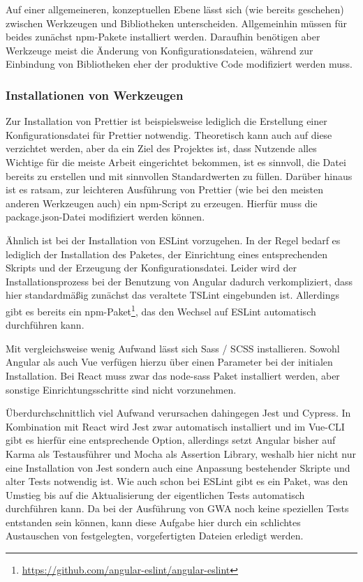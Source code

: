 Auf einer allgemeineren, konzeptuellen Ebene lässt sich (wie bereits geschehen) zwischen Werkzeugen und Bibliotheken unterscheiden. Allgemeinhin müssen für beides zunächst \gls{npm}-Pakete installiert werden. Daraufhin benötigen aber Werkzeuge meist die Änderung von Konfigurationsdateien, während zur Einbindung von Bibliotheken eher der produktive Code modifiziert werden muss.

\subsubsection{Installationen von Werkzeugen}
Zur Installation von Prettier ist beispielsweise lediglich die Erstellung einer Konfigurationsdatei für Prettier notwendig. Theoretisch kann auch auf diese verzichtet werden, aber da ein Ziel des Projektes ist, dass Nutzende alles Wichtige für die meiste Arbeit eingerichtet bekommen, ist es sinnvoll, die Datei bereits zu erstellen und mit sinnvollen Standardwerten zu füllen. Darüber hinaus ist es ratsam, zur leichteren Ausführung von Prettier (wie bei den meisten anderen Werkzeugen auch) ein \gls{npm}-Script zu erzeugen. Hierfür muss die package.json-Datei modifiziert werden können.

Ähnlich ist bei der Installation von ESLint vorzugehen. In der Regel bedarf es lediglich der Installation des Paketes, der Einrichtung eines entsprechenden Skripts und der Erzeugung der Konfigurationsdatei. Leider wird der Installationsprozess bei der Benutzung von Angular dadurch verkompliziert, dass hier standardmäßig zunächst das veraltete TSLint eingebunden ist. Allerdings gibt es bereits ein \gls{npm}-Paket\footnote{\url{https://github.com/angular-eslint/angular-eslint}}, das den Wechsel auf ESLint automatisch durchführen kann.

Mit vergleichsweise wenig Aufwand lässt sich Sass / SCSS installieren. Sowohl Angular als auch Vue verfügen hierzu über einen Parameter bei der initialen Installation. Bei React muss zwar das node-sass Paket installiert werden, aber sonstige Einrichtungsschritte sind nicht vorzunehmen.

Überdurchschnittlich viel Aufwand verursachen dahingegen Jest und Cypress. In Kombination mit React wird Jest zwar automatisch installiert und im Vue-\gls{CLI} gibt es hierfür eine entsprechende Option, allerdings setzt Angular bisher auf Karma als Testausführer und Mocha als Assertion Library, weshalb hier nicht nur eine Installation von Jest sondern auch eine Anpassung bestehender Skripte und alter Tests notwendig ist. Wie auch schon bei ESLint gibt es ein Paket, was den Umstieg bis auf die Aktualisierung der eigentlichen Tests automatisch durchführen kann. Da bei der Ausführung von \gls{GWA} noch keine speziellen Tests entstanden sein können, kann diese Aufgabe hier durch ein schlichtes Austauschen von festgelegten, vorgefertigten Dateien erledigt werden.

